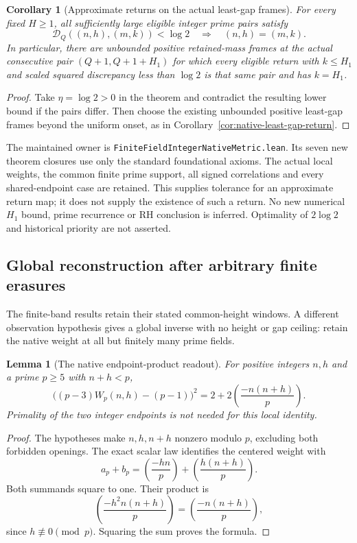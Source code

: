 \documentclass[11pt]{article}
\newtheorem{lemma}[theorem]{Lemma}
\newtheorem{corollary}[theorem]{Corollary}
\begin{document}
\begin{corollary}[Approximate returns on the actual least-gap frames]
\label{cor:native-metric-least-gap}
For every fixed \(H\ge1\), all sufficiently large eligible integer
prime pairs satisfy
\[
 \mathcal D_Q((n,h),(m,k))<\log2
                  \quad\Longrightarrow\quad (n,h)=(m,k).
\]
In particular, there are unbounded positive retained-mass frames at
the actual consecutive pair \((Q+1,Q+1+H_1)\) for which every eligible
return with \(k\le H_1\) and scaled squared discrepancy less than
\(\log2\) is that same pair and has \(k=H_1\).
\end{corollary}
\begin{proof}
Take \(\eta=\log2>0\) in the theorem and contradict the resulting
lower bound if the pairs differ. Then choose the existing unbounded
positive least-gap frames beyond the uniform onset, as in
Corollary~\ref{cor:native-least-gap-return}.
\end{proof}

The maintained owner is \texttt{FiniteFieldIntegerNativeMetric.lean}.
Its seven new theorem closures use only the standard foundational
axioms. The actual local weights, the common finite prime support,
all signed correlations and every shared-endpoint case are retained.
This supplies tolerance for an approximate return map; it does not
supply the existence of such a return. No new numerical \(H_1\) bound,
prime recurrence or RH conclusion is inferred. Optimality of
\(2\log2\) and historical priority are not asserted.



\subsection{Global reconstruction after arbitrary finite erasures}
\label{sec:native-global-return}

The finite-band results retain their stated common-height windows.
A different observation hypothesis gives a global inverse with no
height or gap ceiling: retain the native weight at all but finitely
many prime fields.

\begin{lemma}[The native endpoint-product readout]
\label{lem:native-endpoint-readout}
For positive integers \(n,h\) and a prime \(p\ge5\) with \(n+h<p\),
\[
 \bigl((p-3)W_p(n,h)-(p-1)\bigr)^2
                =2+2\left(\frac{-n(n+h)}p\right).
\]
Primality of the two integer endpoints is not needed for this local identity.
\end{lemma}
\begin{proof}
The hypotheses make \(n,h,n+h\) nonzero modulo \(p\), excluding
both forbidden openings. The exact scalar law identifies the centered
weight with
\[
 a_p+b_p=\left(\frac{-hn}p\right)
                       +\left(\frac{h(n+h)}p\right).
\]
Both summands square to one. Their product is
\[
 \left(\frac{-h^2n(n+h)}p\right)
                         =\left(\frac{-n(n+h)}p\right),
\]
since \(h\not\equiv0\pmod p\). Squaring the sum proves the formula.
\end{proof}
\end{document}
